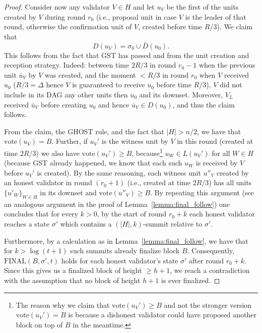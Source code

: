 \documentclass[12pt, fleqn]{article}
\newtheorem{remark}{Remark}
\newcommand{\vote}{\mathrm{vote}}
\newcommand{\final}{\mathrm{FINAL}}
\newcommand{\gst}{\mathrm{GST}}
\newcommand{\damian}[1]{\textcolor{orange}{{\bf Damian:} { #1}}}
\begin{document}
\begin{proof}
Consider now any validator $V\in H$ and let $u_V$ be the first of the units created by $V$ during round $r_0$ (i.e., proposal unit in case $V$ is the leader of that round, otherwise the confirmation unit of $V$, created before time $R/3$).
%
We claim that $$D(u_V) = \sigma_0 \cup \bar{D}(u_0).$$
This follows from the fact that $\gst$ has passed and from the unit creation and reception strategy.
%
Indeed: between time $2R/3$ in round $r_0-1$ when the previous unit $\bar{u}_V$ by $V$ was created, and the moment $<R/3$ in round $r_0$ when $V$ received $u_0$ ($R/3=\Delta$ hence $V$ is guaranteed to receive $u_0$ before time $R/3$), $V$ did not include in its DAG any other units then $u_0$ and its downset.
%
Moreover, $V_L$ received $\bar{u}_V$ before creating $u_0$ and hence $\bar{u}_V \in D(u_0)$, and thus the claim follows.

From the claim, the GHOST rule, and the fact that $|H|>n/2$, we have that $\vote(u_V)=B$.
%
Further, if $u_V'$ is the witness unit by $V$ in this round  (created at time $2R/3$) we also have $\vote(u_V')\geq B$, because\footnote{The reason why we claim that $\vote(u_V') \geq B$ and not the stronger version $\vote(u_V')=B$ is because a dishonest validator could have proposed another block on top of $B$ in the meantime.} $u_W\in L(u_V')$ for all $W\in H$ (because GST already happened, we know that each such $u_W$ is received by $V$ before $u_V'$ is created).
%
By the same reasoning, each witness unit $u''_V$ created by an honest validator in round $(r_0+1)$ (i.e., created at time $2R/3$) has all units $\{u'_W\}_{W\in H}$ in its downset and $\vote(u''_V)\geq B$.
%
By repeating this argument (see an analogous argument in the proof of Lemma~\ref{lemma:final_follow}) one concludes that for every $k>0$, by the start of round $r_0+k$ each honest validator reaches a state $\sigma'$ which contains a $(|H|, k)$-summit relative to $\sigma'$. 

Furthermore, by a calculation as in Lemma~\ref{lemma:final_follow}, we have that for $k>\log(t+1)$ such summits already finalize block $B$.
%
Consequently, $\final(B, \sigma', t)$ holds for each honest validator's state $\sigma'$ after round $r_0+k$.
%
Since this gives us a finalized block of height $\geq h+1$, we reach a contradiction with the assumption that no block of height $h+1$ is ever finalized.
\end{proof}

\end{document}
